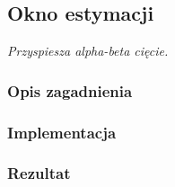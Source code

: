 \subsection{Okno estymacji}
\label{subsec:okno-estymacji}
\textit{Przyspiesza alpha-beta cięcie.}


\subsubsection{Opis zagadnienia}
\subsubsection{Implementacja}
\subsubsection{Rezultat}